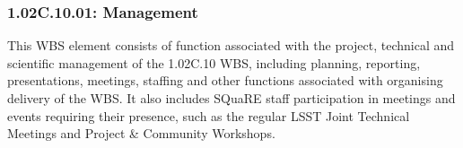 \subsubsection{1.02C.10.01: Management}

This WBS element consists of function associated with the project, technical
and scientific management of the 1.02C.10 WBS, including planning, reporting,
presentations, meetings, staffing and other functions associated with
organising delivery of the WBS. It also includes SQuaRE staff participation in
meetings and events requiring their presence, such as the regular LSST Joint
Technical Meetings and Project \& Community Workshops.

